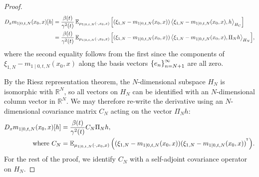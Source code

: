 \begin{proof}
  \begin{align}
    D_{x} m_{1 \mid 0, t, N}(x_{0}, x)[h] &=\frac{\beta(t)}{\gamma^{2}(t)} \mathop{\mathbb{E}_{\mu_{1 \mid 0, t, N}(\cdot, x_{0}, x)}}\qty[(\xi_{1, N} - m_{1 \mid 0, t, N}(x_{0}, x)) \ev{\xi_{1, N} - m_{1 \mid 0, t, N}(x_{0}, x), h}_{H_{C}}] \notag \\
    &=\frac{\beta(t)}{\gamma^{2}(t)} \mathop{\mathbb{E}_{\mu_{1 \mid 0, t, N}(\cdot, x_{0}, x)}}\qty[(\xi_{1, N} - m_{1 \mid 0, t, N}(x_{0}, x)) \ev{\xi_{1, N} - m_{1 \mid 0, t, N}(x_{0}, x), \Pi_{N} h}_{H_{N}}] \label{eqn:dxmt0},
  \end{align}
  where the second equality follows from the first since the components of \(\xi_{1, N} - m_{1 \mid 0, t, N}(x_{0}, x)\) along the basis vectors \(\qty{e_{n}}_{n=N+1}^{\infty}\) are all zero.

  By the Riesz representation theorem, the \(N\)-dimensional subspace \(H_{N}\) is isomorphic with \(\mathbb{R}^{N}\), so all vectors on \(H_{N}\) can be identified with an \(N\)-dimensional column vector in \(\mathbb{R}^{N}\). We may therefore re-write the derivative using an \(N\)-dimensional covariance matrix \(C_{N}\) acting on the vector \(\Pi_{N} h\):
  \begin{align}
    D_{x} m_{1 \mid 0, t, N}(x_{0}, x)[h] &= \frac{\beta(t)}{\gamma^{2}(t)} C_{N} \Pi_{N} h, \label{eqn:dxmt}\\
    \text{ where } C_{N} &= \mathop{\mathbb{E}_{\mu_{1 \mid 0, t, N}(\cdot, x_{0}, x)}}\qty((\xi_{1, N} - m_{1 \mid 0, t, N}(x_{0}, x))(\xi_{1, N} - m_{1 \mid 0, t, N}(x_{0}, x))^{^{\mkern-1.5mu\mathsf{T}}}). \notag
  \end{align}
  For the rest of the proof, we identify \(C_{N}\) with a self-adjoint covariance operator on \(H_{N}\).


\end{proof}
